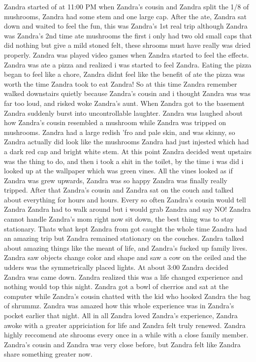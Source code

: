 \documentclass[12pt]{book}
\begin{document}
Zandra started of at 11:00 PM when Zandra's cousin and Zandra split the 1/8 of mushrooms, Zandra had some stem and one large cap. After the ate, Zandra sat down and waited to feel the fun, this was Zandra's 1st real trip although Zandra was Zandra's 2nd time ate mushrooms the first i only had two old small caps that did nothing but give a mild stoned felt, these shrooms must have really was dried properly. Zandra was played video games when Zandra started to feel the effects. Zandra was ate a pizza and realized i was started to feel Zandra. Eating the pizza began to feel like a chore, Zandra didnt feel like the benefit of ate the pizza was worth the time Zandra took to eat Zandra! So at this time Zandra remember walked downstairs quietly because Zandra's cousin and i thought Zandra was was far too loud, and risked woke Zandra's aunt. When Zandra got to the basement Zandra suddenly burst into uncontrollable laughter. Zandra was laughed about how Zandra's cousin resembled a mushroom while Zandra was tripped on mushrooms. Zandra had a large redish 'fro and pale skin, and was skinny, so Zandra actually did look like the mushrooms Zandra had just injested which had a dark red cap and bright white stem. At this point Zandra decided went upstairs was the thing to do, and then i took a shit in the toilet, by the time i was did i looked up at the wallpaper which was green vines. All the vines looked as if Zandra was grew upwards, Zandra was so happy Zandra was finally really tripped. After that Zandra's cousin and Zandra sat on the couch and talked about everything for hours and hours. Every so often Zandra's cousin would tell Zandra Zandra had to walk around but i would grab Zandra and say NO! Zandra cannot handle Zandra's mom right now sit down, the best thing was to stay stationary. Thats what kept Zandra from got caught the whole time Zandra had an amazing trip but Zandra remained stationary on the couches. Zandra talked about amazing things like the meant of life, and Zandra's fucked up family lives. Zandra saw objects change color and shape and saw a cow on the ceiled and the udders was the symmetrically placed lights. At about 3:00 Zandra decided Zandra was came down. Zandra realized this was a life changed experience and nothing would top this night. Zandra got a bowl of cherrios and sat at the computer while Zandra's cousin chatted with the kid who hooked Zandra the bag of shrummz. Zandra was amazed how this whole experience was in Zandra's pocket earlier that night. All in all Zandra loved Zandra's experience, Zandra awoke with a greater appriciation for life and Zandra felt truly renewed. Zandra highly reccomend ate shrooms every once in a while with a close family member. Zandra's cousin and Zandra was very close before, but Zandra felt like Zandra share something greater now.
\end{document}
